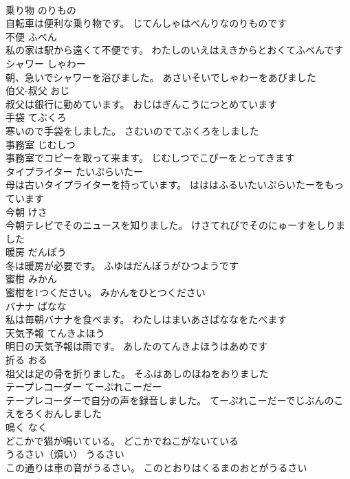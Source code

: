 \documentclass[8pt]{extreport}
\begin{document}
\begin{CJK}{UTF8}{min}
\\	乗り物	のりもの	
\\	自転車は便利な乗り物です。	じてんしゃはべんりなのりものです	
\\	不便	ふべん	
\\	私の家は駅から遠くて不便です。	わたしのいえはえきからとおくてふべんです	
\\	シャワー	しゃわー	
\\	朝、急いでシャワーを浴びました。	あさいそいでしゃわーをあびました	
\\	伯父-叔父	おじ	
\\	叔父は銀行に勤めています。	おじはぎんこうにつとめています	
\\	手袋	てぶくろ	
\\	寒いので手袋をしました。	さむいのでてぶくろをしました	
\\	事務室	じむしつ	
\\	事務室でコピーを取って来ます。	じむしつでこぴーをとってきます	
\\	タイプライター	たいぷらいたー	
\\	母は古いタイプライターを持っています。	はははふるいたいぷらいたーをもっています	
\\	今朝	けさ	
\\	今朝テレビでそのニュースを知りました。	けさてれびでそのにゅーすをしりました	
\\	暖房	だんぼう	
\\	冬は暖房が必要です。	ふゆはだんぼうがひつようです	
\\	蜜柑	みかん	
\\	蜜柑を1つください。	みかんをひとつください	
\\	バナナ	ばなな	
\\	私は毎朝バナナを食べます。	わたしはまいあさばななをたべます	
\\	天気予報	てんきよほう	
\\	明日の天気予報は雨です。	あしたのてんきよほうはあめです	
\\	折る	おる	
\\	祖父は足の骨を折りました。	そふはあしのほねをおりました	
\\	テープレコーダー	てーぷれこーだー	
\\	テープレコーダーで自分の声を録音しました。	てーぷれこーだーでじぶんのこえをろくおんしました	
\\	鳴く	なく	
\\	どこかで猫が鳴いている。	どこかでねこがないている	
\\	うるさい（煩い）	うるさい	
\\	この通りは車の音がうるさい。	このとおりはくるまのおとがうるさい	

\end{CJK}
\end{document}
